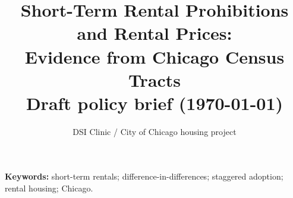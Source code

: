 \documentclass[11pt,letterpaper]{article}
\title{\textbf{Short-Term Rental Prohibitions and Rental Prices:\\
Evidence from Chicago Census Tracts}\\
\vspace{0.5em}
\large Draft policy brief (\today)}
\author{DSI Clinic / City of Chicago housing project}
\date{}
\begin{document}
\maketitle

\begin{abstract}

\end{abstract}

\textbf{Keywords:} short-term rentals; difference-in-differences; staggered adoption; rental housing; Chicago.









\clearpage
\appendix




\end{document}
